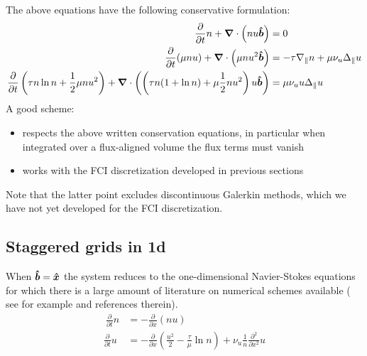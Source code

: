 The above equations have the following conservative formulation:
\begin{align}
    \frac{\partial}{\partial t} n  + {\boldsymbol{\nabla}}\cdot\left( nu \bm{\hat{b}}\right) &= 0 \\
    \frac{\partial}{\partial t} (\mu nu)  + {\boldsymbol{\nabla}}\cdot\left(\mu nu^2 \bm{\hat{b}}\right) &=
    -\tau \nabla_\parallel n + \mu \nu_u \Delta_\parallel u \\
    \frac{\partial}{\partial t} \left(\tau n \ln n + \frac{1}{2}\mu nu^2\right)
    + {\boldsymbol{\nabla}}\cdot\left( \left( \tau n ( 1 + \ln n)  +\mu \frac{1}{2} nu^2\right) u\bm{\hat{b}} \right) &= \mu \nu_u u \Delta_\parallel u
\end{align}
A good scheme:
\begin{itemize}
    \item respects the above written conservation equations, in particular when
        integrated over a flux-aligned volume the flux terms must vanish
    \item works with the FCI discretization developed in previous sections
\end{itemize}
Note that the latter point excludes discontinuous Galerkin methods, which we have not
yet developed for the FCI discretization.
\subsection{Staggered grids in 1d}
When $\bm{\hat{b}} = \bm{\hat{x}}$ the system reduces to the one-dimensional Navier-Stokes equations for which there is a large amount of literature on numerical schemes available
( see for example \cite{LeVeque} and references therein).
\begin{align}
    \
    \frac{\partial}{\partial t} n &= - \frac{\partial}{\partial x}\left( nu\right) \\
    \frac{\partial}{\partial t} u &= - \frac{\partial}{\partial x}\left(\frac{u^2}{2} - \frac{\tau}{\mu} \ln n\right) + \nu_u \frac{1}{n}\frac{\partial^2}{\partial x^2} u
\end{align}

